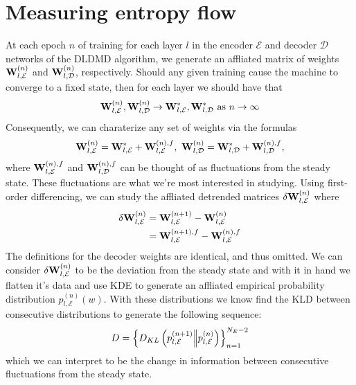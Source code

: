 \section{Measuring entropy flow}
At each epoch $n$ of training for each layer $l$ in the encoder $\mathcal{E}$ and 
decoder $\mathcal{D}$ networks of the DLDMD algorithm, we generate an affliated matrix 
of weights ${\bf W}_{l,\mathcal{E}}^{(n)}$ and ${\bf W}_{l,\mathcal{D}}^{(n)}$, respectively.
Should any given training cause the machine to converge to a fixed state, then for each layer
we should have that
\begin{equation}
    {\bf W}_{l,\mathcal{E}}^{(n)}, {\bf W}_{l,\mathcal{D}}^{(n)} \to 
    {\bf W}_{l,\mathcal{E}}^{*}, {\bf W}_{l,\mathcal{D}}^{*} \text{ as }
    n \to \infty \label{eqn:weight convergence}
\end{equation}
Consequently, we can charaterize any set of weights via the formulas
\begin{equation}
    {\bf W}_{l,\mathcal{E}}^{(n)} = {\bf W}_{l,\mathcal{E}}^{*} + {\bf W}_{l,\mathcal{E}}^{(n),f},\
    {\bf W}_{l,\mathcal{D}}^{(n)} = {\bf W}_{l,\mathcal{D}}^{*} + {\bf W}_{l,\mathcal{D}}^{(n),f},
\end{equation}
where ${\bf W}_{l,\mathcal{E}}^{(n),f}$ and 
${\bf W}_{l,\mathcal{D}}^{(n),f}$ can be thought of as fluctuations from the 
steady state. These fluctuations are what we're 
most interested in studying. Using first-order differencing, we can study the affliated 
detrended matrices $\delta{\bf W}_{l,\mathcal{E}}^{(n)}$ where
\begin{align*}
    \delta{\bf W}_{l,\mathcal{E}}^{(n)} &= {\bf W}_{l,\mathcal{E}}^{(n+1)} - {\bf W}_{l,\mathcal{E}}^{(n)} \\
    &= {\bf W}_{l,\mathcal{E}}^{(n+1),f} - {\bf W}_{l,\mathcal{E}}^{(n),f}
\end{align*}
The definitions for the decoder weights are identical, and thus omitted. We can consider 
$\delta{\bf W}_{l,\mathcal{E}}^{(n)}$ to be the deviation from the steady state and with it 
in hand we flatten it's data and use KDE to generate an affliated empirical probability 
distribution $p_{l,\mathcal{E}}^{(n)}(w)$. With these distributions we know find the KLD 
between consecutive distributions to generate the following sequence: 
\begin{equation}
    D = \left\{D_{KL}\left(p_{l,\mathcal{E}}^{(n+1)} \Big|\!\Big| p_{l,\mathcal{E}}^{(n)}\right)\right\}_{n=1}^{N_E - 2}
\end{equation}
which we can interpret to be the change in information between consecutive fluctuations from the 
steady state.

